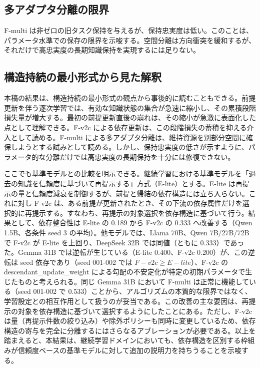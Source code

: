 \documentclass[12pt,a4paper]{article}
\begin{document}
\subsection{多アダプタ分離の限界}\label{ux591aux30a2ux30c0ux30d7ux30bfux5206ux96e2ux306eux9650ux754c}

F-multi は非ゼロの旧タスク保持を与えるが、保持忠実度は低い。このことは、パラメータ水準での保存の限界を示唆する。空間分離は方向衝突を緩和するが、それだけで高忠実度の長期知識保持を実現するには足りない。

\subsection{構造持続の最小形式から見た解釈}\label{ux69cbux9020ux6301ux7d9aux306eux6700ux5c0fux5f62ux5f0fux304bux3089ux898bux305fux89e3ux91c8}

本稿の結果は、構造持続の最小形式の観点から事後的に読むこともできる。前提更新を伴う逐次学習では、有効な知識状態の集合が急速に縮小し、その累積段階損失量が増大する。最初の前提更新直後の崩れは、その縮小が急激に表面化した点として理解できる。F-v2c による依存更新は、この段階損失の蓄積を抑える介入として読める。F-multi による多アダプタ分離は、維持資源を別部分空間に確保しようとする試みとして読める。しかし、保持忠実度の低さが示すように、パラメータ的な分離だけでは高忠実度の長期保持を十分には修復できない。

ここでも基準モデルとの比較を明示できる。継続学習における基準モデルを「過去の知識を信頼度に基づいて再提示する」方式（E-lite）とする。E-lite は再提示の量と信頼度減衰を制御するが、前提と帰結の依存構造には立ち入らない。これに対し F-v2c は、ある前提が更新されたとき、その下流の依存属性だけを選択的に再提示する。すなわち、再提示の対象選択を依存構造に基づいて行う。結果として、依存整合性は E-lite の 0.189 から F-v2c の 0.333 へ改善する（Qwen 1.5B、各条件 seed 3 の平均）。他モデルでは、Llama 70B、Qwen 7B/27B/72B で F-v2c が E-lite を上回り、DeepSeek 32B では同値（ともに 0.333）であった。Gemma 31B では逆転が生じている（E-lite 0.400、F-v2c 0.200）が、この逆転は seed 依存であり（seed 001-002 では \(F-v2c \ge E-lite\)）、F-v2c の descendant\_update\_weight による勾配の不安定化が特定の初期パラメータで生じたものと考えられる。同じ Gemma 31B において F-multi は正常に機能している（seed 001-002 で 0.533）ことから、アルゴリズムの本質的な限界ではなく、学習設定との相互作用として扱うのが妥当である。この改善の主な要因は、再提示の対象を依存構造に基づいて選択するようにしたことにある。ただし、F-v2c は量（再提示件数の絞り込み）や除外ポリシーも同時に変更しているため、依存構造の寄与を完全に分離するにはさらなるアブレーションが必要である。以上を踏まえると、本結果は、継続学習ドメインにおいても、依存構造を区別する枠組みが信頼度ベースの基準モデルに対して追加の説明力を持ちうることを示唆する。
\end{document}
